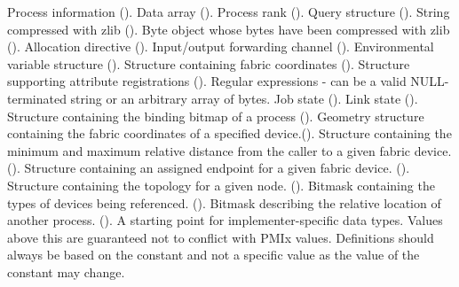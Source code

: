 \begin{constantdesc}
Process information ().
%
Data array ().
%
Process rank ().
%
Query structure ().
%
String compressed with zlib ().
%
Byte object whose bytes have been compressed with zlib ().
%
Allocation directive ().
%
Input/output forwarding channel ().
%
Environmental variable structure ().
%
Structure containing fabric coordinates ().
%
Structure supporting attribute registrations ().
%
Regular expressions - can be a valid NULL-terminated string or an arbitrary array of bytes.
%
Job state ().
%
Link state ().
%
Structure containing the binding bitmap of a process ().
%
Geometry structure containing the fabric coordinates of a specified device.().
%
Structure containing the minimum and maximum relative distance from the caller to a given fabric device. ().
%
Structure containing an assigned endpoint for a given fabric device. ().
%
Structure containing the topology for a given node. ().
%
Bitmask containing the types of devices being referenced. ().
%
Bitmask describing the relative location of another process. ().
%
A starting point for implementer-specific data types.
Values above this are guaranteed not to conflict with \ac{PMIx} values.
Definitions should always be based on the  constant and not a specific value as the value of the constant may change.
%
\end{constantdesc}


